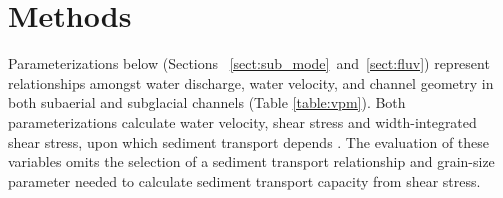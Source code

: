 \documentclass[11pt]{article}
\begin{document}
\section{Methods}
\label{sect:meth}
Parameterizations below (Sections ~\ref{sect:sub_mode}~and~\ref{sect:fluv}) represent relationships amongst water discharge, water velocity, and channel geometry in both subaerial and subglacial channels (Table \ref{table:vpm}).
Both parameterizations calculate   water velocity, shear stress and width-integrated shear stress, upon which sediment transport depends \citep[Figure \ref{fig:cartoon}; ][]{shields1936}.
The evaluation of these variables omits the selection of a sediment transport relationship and grain-size parameter \citep[e.g.][]{shields1936,meyer1948} needed to calculate sediment transport capacity from shear stress.
\end{document}
